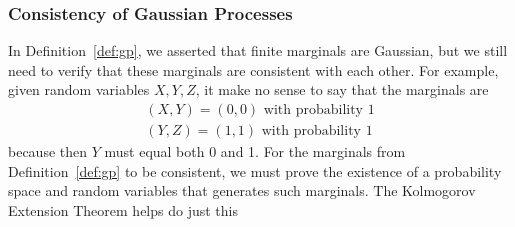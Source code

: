 \subsubsection{Consistency of Gaussian Processes}

In Definition~\ref{def:gp}, we asserted that finite marginals are Gaussian, but we still need to verify that these marginals are consistent with each other.
For example, given random variables $X, Y, Z$, it make no sense to say that the marginals are
\begin{align*}
    (X, Y) = (0, 0) \text{ with probability 1} \\
    (Y, Z) = (1, 1) \text{ with probability 1}
\end{align*}
because then $Y$ must equal both 0 and 1.
For the marginals from Definition~\ref{def:gp} to be consistent, we must prove the existence of a probability space and random variables that generates such marginals.
The Kolmogorov Extension Theorem helps do just this

